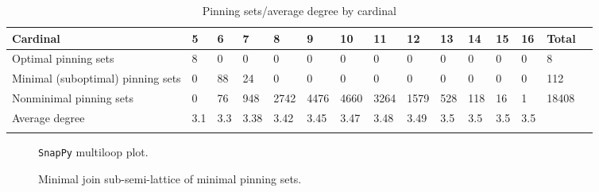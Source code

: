 \documentclass{article}%
\begin{document}
\begin{table}[ht]
	\caption{Pinning sets/average degree by cardinal}
	\centering
	\renewcommand{\arraystretch}{1.5}
	\begin{tabularx}{\textwidth}{lXXXXXXXXXXXXXX}
		\toprule
			Cardinal & 5 & 6 & 7 & 8 & 9 & 10 & 11 & 12 & 13 & 14 & 15 & 16 & Total\\
			\hline
			Optimal pinning sets & 8 & 0 & 0 & 0 & 0 & 0 & 0 & 0 & 0 & 0 & 0 & 0 & 8 \\
			Minimal (suboptimal) pinning sets & 0 & 88 & 24 & 0 & 0 & 0 & 0 & 0 & 0 & 0 & 0 & 0 & 112 \\
			Nonminimal pinning sets & 0 & 76 & 948 & 2742 & 4476 & 4660 & 3264 & 1579 & 528 & 118 & 16 & 1 & 18408 \\
			Average degree & 3.1 & 3.3 & 3.38 & 3.42 & 3.45 & 3.47 & 3.48 & 3.49 & 3.5 & 3.5 & 3.5 & 3.5 &  \\
		\bottomrule \\ 
	\end{tabularx}
\end{table}

\begin{multicols}{2}
\begin{figure}[H]
\centering

\caption{\texttt{SnapPy} multiloop plot.}
\label{fig:tex/img/[[7, 22, 8, 1], [6, 28, 7, 23], [14, 21, 15, 22], [8, 15, 9, 16], [1, 16, 2, 17], [23, 17, 24, 18], [12, 5, 13, 6], [13, 27, 14, 28], [20, 26, 21, 27], [9, 26, 10, 25], [2, 25, 3, 24], [18, 11, 19, 12.svg}
\end{figure}
\columnbreak

\begin{figure}[H]
\centering
\scalebox{0.8}{}
\caption{Minimal join sub-semi-lattice of minimal pinning sets.}
\label{fig:tex/img/[[7, 22, 8, 1], [6, 28, 7, 23], [14, 21, 15, 22], [8, 15, 9, 16], [1, 16, 2, 17], [23, 17, 24, 18], [12, 5, 13, 6], [13, 27, 14, 28], [20, 26, 21, 27], [9, 26, 10, 25], [2, 25, 3, 24], [18, 11, 19, 12.pgf}
\end{figure}
\end{multicols}
\end{document}
